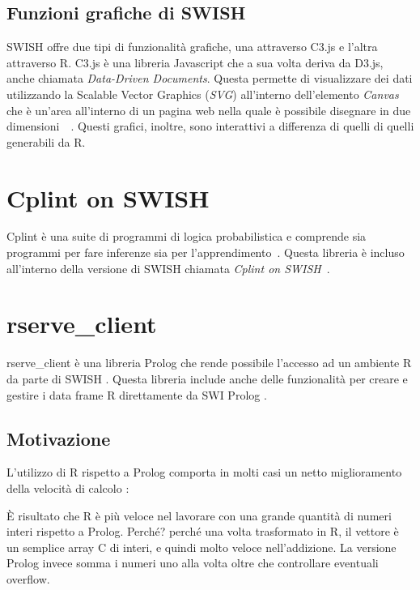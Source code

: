 \documentclass[10pt,titlepage,twoside,a4paper]{report}
\begin{document}
        \subsection{Funzioni grafiche di SWISH}
SWISH offre due tipi di funzionalità grafiche, una attraverso C3.js e l'altra
attraverso R. C3.js è una libreria Javascript che a sua volta deriva da
D3.js, anche chiamata \emph{Data-Driven Documents}. Questa permette di 
visualizzare dei dati utilizzando la Scalable Vector Graphics (\emph{SVG}) 
all'interno dell'elemento \emph{Canvas} che è un'area all'interno di un 
pagina web nella quale è possibile disegnare in due 
dimensioni~\cite{canvasHtml}~\cite{d3js}. Questi grafici, inoltre, sono 
interattivi a differenza di quelli di quelli generabili da R.


\section{Cplint on SWISH}
Cplint è una suite di programmi di logica probabilistica e comprende sia 
programmi per fare inferenze sia per l'apprendimento~\cite{cplint}. Questa 
libreria è  incluso all'interno della versione di SWISH chiamata \emph{Cplint 
on SWISH}~\cite{cplintOnSwish}.


    \section{rserve\_client}
rserve\_client è una libreria Prolog che rende possibile 
l'accesso ad un ambiente R da parte di SWISH \cite{rserveClientDefinition} 
\cite{rserveclient}. Questa libreria include anche delle funzionalità per 
creare e gestire i data frame R direttamente da SWI Prolog 
\cite{swishRDataLibrary}.
    
        \subsection{Motivazione}
L'utilizzo di R rispetto a Prolog comporta in molti casi un netto miglioramento 
della velocità di calcolo \cite{rFaster}:
\begin{displayquote}
[..] È risultato che R è più veloce nel lavorare con una grande quantità
di numeri interi rispetto a Prolog. Perché? perché una volta trasformato in R,
il vettore è un semplice array C di interi, e quindi molto veloce 
nell'addizione. La versione Prolog invece somma i numeri uno alla volta
oltre che controllare eventuali overflow.
\end{displayquote}
\end{document}

